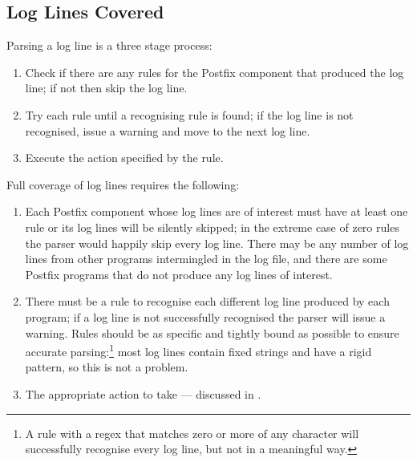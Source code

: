 \subsection{Log Lines Covered}

\label{log-lines-covered}

Parsing a log line is a three stage process:

\begin{enumerate}

    \item Check if there are any rules for the Postfix component that
        produced the log line; if not then skip the log line.

    \item Try each rule until a recognising rule is found; if the log line
        is not recognised, issue a warning and move to the next log line.

    \item Execute the action specified by the rule.

\end{enumerate}

Full coverage of log lines requires the following:

\begin{enumerate}

    \item Each Postfix component whose log lines are of interest must have
        at least one rule or its log lines will be silently skipped; in the
        extreme case of zero rules the parser would happily skip every log
        line.  There may be any number of log lines from other programs
        intermingled in the log file, and there are some Postfix programs
        that do not produce any log lines of interest.

    \item There must be a rule to recognise each different log line
        produced by each program; if a log line is not successfully
        recognised the parser will issue a warning.  Rules should be as
        specific and tightly bound as possible to ensure accurate
        parsing:\footnote{A rule with a regex that matches zero or more of
        any character will successfully recognise every log line, but not
        in a meaningful way.} most log lines contain fixed strings and have
        a rigid pattern, so this is not a problem.

    \item The appropriate action to take --- discussed in
        .

\end{enumerate}

